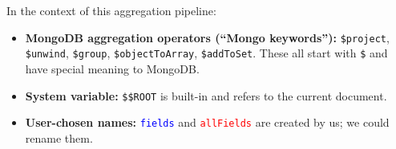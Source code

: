 \documentclass[9pt]{article}
\begin{document}
In the context of this aggregation pipeline:

\begin{itemize}
  \item \textbf{MongoDB aggregation operators (``Mongo keywords''):}
    \texttt{\$project}, \texttt{\$unwind}, \texttt{\$group},
    \texttt{\$objectToArray}, \texttt{\$addToSet}.
    These all start with \texttt{\$} and have special meaning to MongoDB.
  \item \textbf{System variable:} \texttt{\$\$ROOT} is built-in and refers to the current document.
  \item \textbf{User-chosen names:}
    \texttt{\textcolor{blue}{fields}} and
    \texttt{\textcolor{red}{allFields}} are created by us; we could rename them.
\end{itemize}
\end{document}
